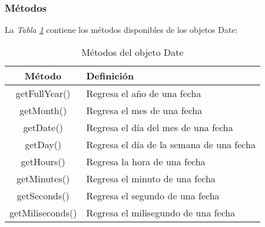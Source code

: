 \subsubsection{Métodos}
\hspace{0.55cm}La \textit{Tabla \ref{tab: 8}} contiene los métodos disponibles de los objetos Date:
\begin{table}[H]
    \begin{center}
        \caption{Métodos del objeto Date}
        \label{tab: 8}
        \begin{tabular}{c l}
            \hline
            \textbf{Método}&\textbf{Definición} \\
            \hline
            getFullYear() & Regresa el año de una fecha \\
            getMonth() & Regresa el mes de una fecha \\
            getDate() & Regresa el día del mes de una fecha \\
            getDay() & Regresa el día de la semana de una fecha \\
            getHours() & Regresa la hora de una fecha \\
            getMinutes() & Regresa el minuto de una fecha \\
            getSeconds() & Regresa el segundo de una fecha \\
            getMiliseconds() & Regresa el milisegundo de una fecha \\
            \hline
        \end{tabular}
    \end{center}
\end{table}



